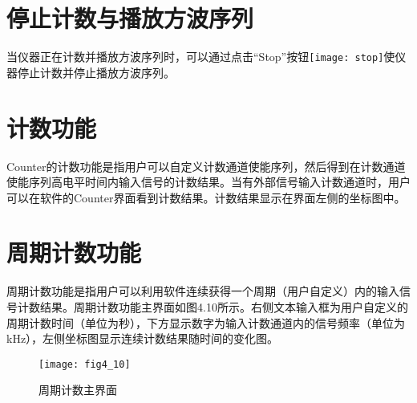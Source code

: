 \section{\heiti 停止计数与播放方波序列}
当仪器正在计数并播放方波序列时，可以通过点击“Stop”按钮\texttt{[image: stop]}使仪器停止计数并停止播放方波序列。

\section{\heiti 计数功能}
Counter的计数功能是指用户可以自定义计数通道使能序列，然后得到在计数通道使能序列高电平时间内输入信号的计数结果。当有外部信号输入计数通道时，用户可以在软件的Counter界面看到计数结果。计数结果显示在界面左侧的坐标图中。

\section{\heiti 周期计数功能}
周期计数功能是指用户可以利用软件连续获得一个周期（用户自定义）内的输入信号计数结果。周期计数功能主界面如图4.10所示。右侧文本输入框为用户自定义的周期计数时间（单位为秒），下方显示数字为输入计数通道内的信号频率（单位为kHz），左侧坐标图显示连续计数结果随时间的变化图。
\begin{figure}[ht]
\centering
\texttt{[image: fig4\_10]}
\caption{周期计数主界面}
\end{figure}

